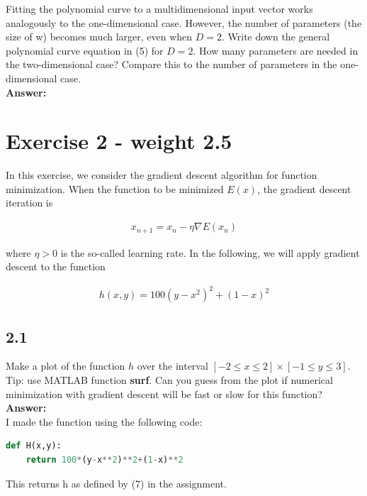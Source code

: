 \documentclass[a4paper]{article}
\begin{document}
Fitting the polynomial curve to a multidimensional input vector works analogously to the one-dimensional case. However, the number of parameters (the size of w) becomes much larger, even when $D = 2$. Write down the general polynomial curve equation in (5) for $D = 2$. How many parameters are needed in the two-dimensional case? Compare this to the number of parameters in the one-dimensional case.\\


\textbf{Answer:}\\

\section*{Exercise 2 - weight 2.5}

In this exercise, we consider the gradient descent algorithm for function minimization. When the function to be minimized $E(x)$, the gradient descent iteration is

\begin{align*}
	x_{n+1} = x_n - \eta \nabla E(x_n)
\end{align*}

where $\eta > 0$ is the so-called learning rate. In the following, we will apply gradient descent to the function

\begin{align*}
	h(x,y) = 100(y - x^2)^2 + (1 - x)^2
\end{align*}

\subsection*{2.1}

Make a plot of the function $h$ over the interval $[-2 \leq x \leq 2] \times [-1 \leq y \leq 3]$. Tip: use MATLAB function \textbf{surf}. Can you guess from the plot if numerical minimization with gradient descent will be fast or slow for this function?\\

\textbf{Answer:}\\

I made the function using the following code:


\begin{lstlisting}[language=Python]
def H(x,y):
    return 100*(y-x**2)**2+(1-x)**2
\end{lstlisting}

This returns h as defined by (7) in the assignment.
\end{document}
